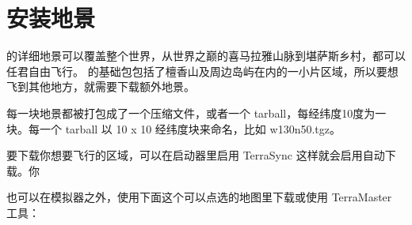 \ifchinese
\section{安装地景}
\fi

\ifchinese
\FlightGear{} 的详细地景可以覆盖整个世界，从世界之巅的喜马拉雅山脉到堪萨斯乡村，都可以任君自由飞行。\FlightGear{}  的基础包包括了檀香山及周边岛屿在内的一小片区域，所以要想飞到其他地方，就需要下载额外地景。

每一块地景都被打包成了一个压缩文件，或者一个 tarball，每经纬度10度为一块。每一个 tarball 以 10 x 10 经纬度块来命名，比如 w130n50.tgz。

要下载你想要飞行的区域，可以在启动器里启用 TerraSync 这样就会启用自动下载。你

也可以在模拟器之外，使用下面这个可以点选的地图里下载或使用 TerraMaster 工具：
\fi
%
%

